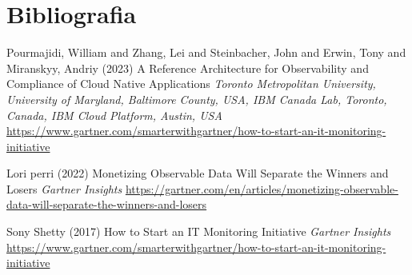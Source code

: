 \documentclass[]{beamer}
\begin{document}
\section{Bibliografia}

\begin{frame}
  \begin{thebibliography}{99} %
   Pourmajidi, William and Zhang, Lei and Steinbacher, John and Erwin, Tony and Miranskyy, Andriy (2023)
  \newblock A Reference Architecture for Observability and Compliance of Cloud Native Applications
  \newblock \emph{Toronto Metropolitan University, University of Maryland, Baltimore County, USA, IBM Canada Lab, Toronto, Canada, IBM Cloud Platform, Austin, USA}
  \newblock \url{https://www.gartner.com/smarterwithgartner/how-to-start-an-it-monitoring-initiative}

   Lori perri (2022)
  \newblock Monetizing Observable Data Will Separate the Winners and Losers
  \newblock \emph{Gartner Insights}
  \newblock \url{https://gartner.com/en/articles/monetizing-observable-data-will-separate-the-winners-and-losers}

  \end{thebibliography}
\end{frame}

\begin{frame}
  \begin{thebibliography}{99} %
   Sony Shetty (2017)
  \newblock How to Start an IT Monitoring Initiative
  \newblock \emph{Gartner Insights}
  \newblock \url{https://www.gartner.com/smarterwithgartner/how-to-start-an-it-monitoring-initiative}

  \end{thebibliography}
\end{frame}
\end{document}
